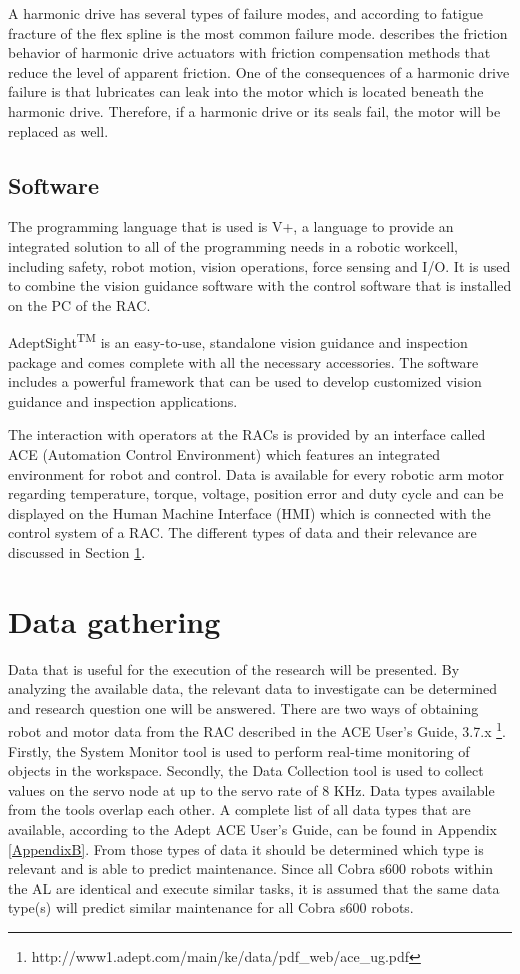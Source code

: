 A harmonic drive has several types of failure modes, and according to \citet{Schafer2005} fatigue fracture of the flex spline is the most common failure mode. \citet{Hauschild2007} describes the friction behavior of harmonic drive actuators with friction compensation methods that reduce the level of apparent friction. One of the consequences of a harmonic drive failure is that lubricates can leak into the motor which is located beneath the harmonic drive. Therefore, if a harmonic drive or its seals fail, the motor will be replaced as well. 

\subsection{Software} \label{Software}
The programming language that is used is V+, a language to provide an integrated solution to all of the programming needs in a robotic workcell, including safety, robot motion, vision operations, force sensing and I/O. It is used to combine the vision guidance software with the control software that is installed on the PC of the RAC. 

AdeptSight\textsuperscript{\tiny{TM}} is an easy-to-use, standalone vision guidance and inspection package and comes complete with all the necessary accessories. The software includes a powerful framework that can be used to develop customized vision guidance and inspection applications. 

The interaction with operators at the RACs is provided by an interface called ACE (Automation Control Environment) which features an integrated environment for robot and control. Data is available for every robotic arm motor regarding temperature, torque, voltage, position error and duty cycle and can be displayed on the Human Machine Interface (HMI) which is connected with the control system of a RAC. The different types of data and their relevance are discussed in Section \ref{Data Gathering}.

\section{Data gathering} \label{Data Gathering}
Data that is useful for the execution of the research will be presented. By analyzing the available data, the relevant data to investigate can be determined and research question one will be answered. There are two ways of obtaining robot and motor data from the RAC described in the ACE User's Guide, 3.7.x \footnote{http://www1.adept.com/main/ke/data/pdf\_web/ace\_ug.pdf}. Firstly, the System Monitor tool is used to perform real-time monitoring of objects in the workspace. Secondly, the Data Collection tool is used to collect values on the servo node at up to the servo rate of 8 KHz. Data types available from the tools overlap each other. A complete list of all data types that are available, according to the Adept ACE User's Guide, can be found in Appendix \ref{AppendixB}. From those types of data it should be determined which type is relevant and is able to predict  maintenance. Since all Cobra s600  robots within the AL are identical and execute similar tasks, it is assumed that the same data type(s) will predict similar maintenance for all Cobra s600 robots.

